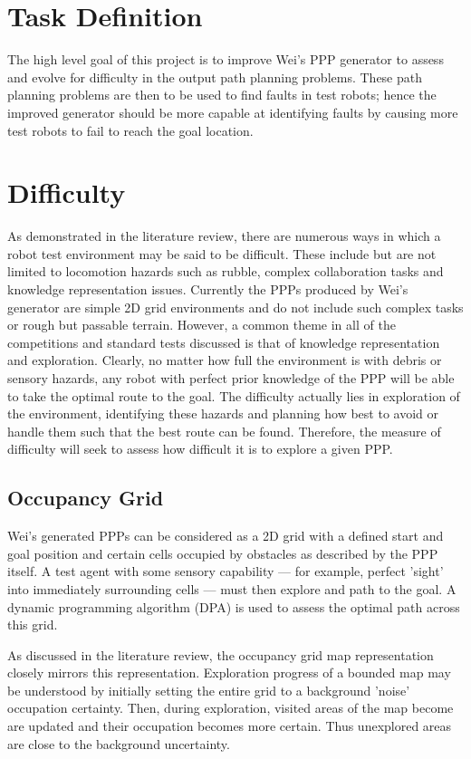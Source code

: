 \documentclass[authoryearcitations]{UoYCSproject}
\begin{document}
\section{Task Definition}
\label{sec:pa2}
The high level goal of this project is to improve Wei's PPP generator to assess and evolve for difficulty in the output path planning problems. These path planning problems are then to be used to find faults in test robots; hence the improved generator should be more capable at identifying faults by causing more test robots to fail to reach the goal location.

\section{Difficulty}
\label{sec:pa3}
As demonstrated in the literature review, there are numerous ways in which a robot test environment may be said to be difficult. These include but are not limited to locomotion hazards such as rubble, complex collaboration tasks and knowledge representation issues. Currently the PPPs produced by Wei's generator are simple 2D grid environments and do not include such complex tasks or rough but passable terrain. However, a common theme in all of the competitions and standard tests discussed is that of knowledge representation and exploration. Clearly, no matter how full the environment is with debris or sensory hazards, any robot with perfect prior knowledge of the PPP will be able to take the optimal route to the goal. The difficulty actually lies in exploration of the environment, identifying these hazards and planning how best to avoid or handle them such that the best route can be found. Therefore, the measure of difficulty will seek to assess how difficult it is to explore a given PPP.

\subsection{Occupancy Grid}
\label{sec:pa3_occ_grid}
Wei's generated PPPs can be considered as a 2D grid with a defined start and goal position and certain cells occupied by obstacles as described by the PPP itself. A test agent with some sensory capability --- for example, perfect 'sight' into immediately surrounding cells --- must then explore and path to the goal. A dynamic programming algorithm (DPA) is used to assess the optimal path across this grid.

As discussed in the literature review, the occupancy grid map representation closely mirrors this representation. Exploration progress of a bounded map may be understood by initially setting the entire grid to a background 'noise' occupation certainty. Then, during exploration, visited areas of the map become are updated and their occupation becomes more certain. Thus unexplored areas are close to the background uncertainty.
\end{document}
